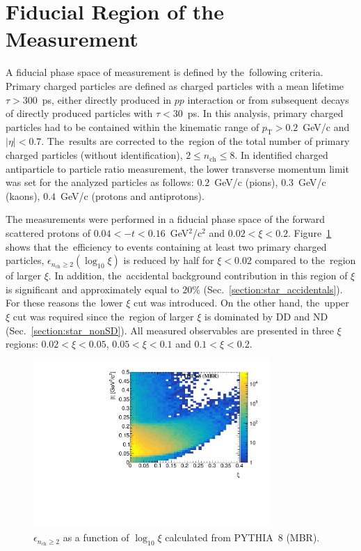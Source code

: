 \section{Fiducial Region of the Measurement}\label{section:star_fiducial}
A fiducial phase space of measurement  is defined by the~following criteria. Primary charged particles are defined as charged particles with a mean lifetime $\tau >300$~ps, either directly produced in $pp$ interaction or from subsequent decays of directly produced particles with $\tau <30$~ps. In this analysis, primary charged particles had to be contained within the kinematic range of $p_\textrm{T}>0.2$~GeV/c and $|\eta|<0.7$.
The~results are corrected to the~region of the total number of primary charged particles (without identification), $2\leq n_\textrm{ch} \leq 8$.  In identified charged antiparticle to particle ratio measurement, the lower transverse momentum limit was set for the analyzed particles as follows: $0.2$~GeV/c (pions), $0.3$~GeV/c (kaons), $0.4$~GeV/c (protons and antiprotons).

The measurements were performed in a fiducial phase space of the forward scattered protons of $0.04<-t<0.16$~GeV$^{2}$/c$^2$ and $0.02 < \xi<0.2$. Figure~\ref{fig:STARtrueMCfiducial} shows that the~efficiency  to events containing at least two primary charged particles, $\epsilon_{n_\textrm{ch}\geq 2}(\log_{10}\xi)$  is reduced by half for $\xi <0.02$ compared to the~region of larger $\xi$. In addition, the~accidental background contribution in  this region of $\xi$ is significant and  approximately equal to $20\%$ (Sec.~\ref{section:star_accidentals}). For these reasons the~lower $\xi$ cut was introduced. On the other hand, the~upper $\xi$ cut was required since the~region of larger $\xi$ is dominated by \ac{DD} and \ac{ND} (Sec.~\ref{section:star_nonSD}). 
All measured observables are presented in three $\xi$ regions: $0.02<\xi<0.05$, $0.05<\xi<0.1$ and $0.1<\xi<0.2$.

\begin{figure}[h!]
	\centering
	\includegraphics[width=0.8\textwidth, page=17]{chapters/dataSampleSTAR/img/true.pdf}
	\caption{$\epsilon_{ n_\textrm{ch} \geq 2}$ as a function of $\log_{10}\xi$ calculated from PYTHIA~8 (MBR).}
	\label{fig:STARtrueMCfiducial}
\end{figure}

\FloatBarrier